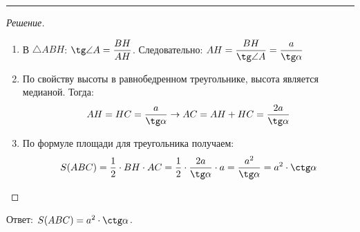 \documentclass[11 pt,russian]{article}
\theoremstyle{plain}
\theoremstyle{definition}
\newcommand{\Answer}[1]{\vspace{-0.3cm}Ответ: #1.}
\begin{document}
\vspace{1cm}
\hrule
\vspace{1cm}

\begin{figure}[h]
\end{figure}


\begin{proof}[Решение]\ 
\begin{enumerate}
\item В $\triangle ABH$: $\tg\angle A =\dfrac{BH}{AH}$. Следовательно: $AH=\dfrac{BH}{\tg\angle A}=\dfrac{a}{\tg\alpha}$
\item По свойству высоты в равнобедренном треугольнике, высота является медианой. Тогда:
$$
AH=HC=\dfrac{a}{\tg\alpha}\rightarrow AC=AH+HC=\dfrac{2a}{\tg\alpha}
 $$
\item По формуле площади для треугольника получаем:
$$
S(ABC)=\dfrac{1}{2}\cdot BH\cdot AC=\dfrac{1}{2}\cdot\dfrac{2a}{\tg\alpha}\cdot a=\dfrac{a^2}{\tg\alpha}=a^2\cdot\ctg\alpha
$$

\end{enumerate}

\end{proof}
\Answer{$S(ABC)=a^2\cdot\ctg\alpha$}
\end{document}
